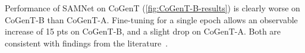 Performance of SAMNet on CoGenT (\cref{fig:CoGenT-B-results}) is clearly worse on CoGenT-B than CoGenT-A.
Fine-tuning for a single epoch allows an observable increase of 15 pts on CoGenT-B, and a slight drop on CoGenT-A.
Both are consistent with findings from the literature~\cite{johnson2017inferring, mascharka2018transparency, perez2018film}.
